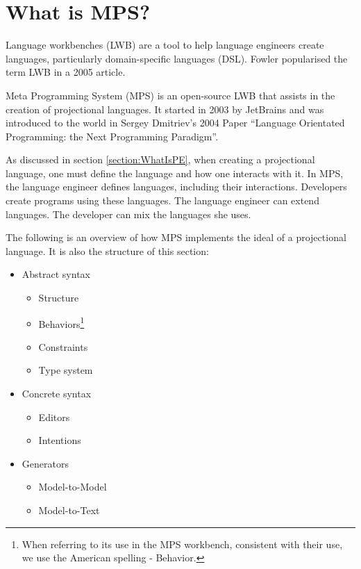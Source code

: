 \section{What is MPS?}
\label{section:MPS}

Language workbenches (LWB) are a tool to help language engineers create languages, particularly domain-specific languages (DSL).
Fowler\cite{Fowler_lwb} popularised the term LWB in a 2005 article.

Meta Programming System (MPS) is an open-source LWB that assists in the creation of projectional languages.
It started in 2003 by JetBrains and was introduced to the world in Sergey Dmitriev's 2004 Paper ``Language Orientated Programming: the Next Programming Paradigm''\cite{dmitriev2004language}.

As discussed in section \ref{section:WhatIsPE}, when creating a projectional language, one must define the language and how one interacts with it.
In MPS, the language engineer defines languages, including their interactions.
Developers create programs using these languages.
The language engineer can extend languages.
The developer can mix the languages she uses.

The following is an overview of how MPS implements the ideal of a projectional language.
It is also the structure of this section: 

\begin{itemize}
    \setlength\itemsep{0em}
    \item Abstract syntax
    \begin{itemize}
        \setlength\itemsep{0em}
        \item Structure
        \item Behaviors\footnote{When referring to its use in the MPS workbench, consistent with their use, we use the American spelling - Behavior.}
        \item Constraints
        \item Type system
    \end{itemize}
    \item Concrete syntax
    \begin{itemize}
        \setlength\itemsep{0em}
        \item Editors
        \item Intentions
    \end{itemize}
    \item Generators
    \begin{itemize}
        \setlength\itemsep{0em}
        \item Model-to-Model
        \item Model-to-Text
    \end{itemize}
\end{itemize}

